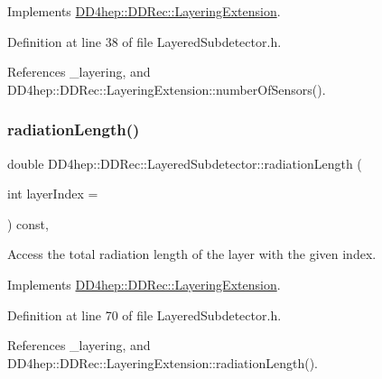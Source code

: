 Implements \hyperlink{class_d_d4hep_1_1_d_d_rec_1_1_layering_extension_a91d00c26112a0456117d1036db335e5d}{D\+D4hep\+::\+D\+D\+Rec\+::\+Layering\+Extension}.



Definition at line 38 of file Layered\+Subdetector.\+h.



References \+\_\+layering, and D\+D4hep\+::\+D\+D\+Rec\+::\+Layering\+Extension\+::number\+Of\+Sensors().

\hypertarget{class_d_d4hep_1_1_d_d_rec_1_1_layered_subdetector_addf81ffffc91b391f0ccd62c37a084a1}{}\label{class_d_d4hep_1_1_d_d_rec_1_1_layered_subdetector_addf81ffffc91b391f0ccd62c37a084a1} 
\subsubsection{\texorpdfstring{radiation\+Length()}{radiationLength()}}
{\footnotesize\ttfamily double D\+D4hep\+::\+D\+D\+Rec\+::\+Layered\+Subdetector\+::radiation\+Length (\begin{DoxyParamCaption}\item[{int}]{layer\+Index = {} }\end{DoxyParamCaption}) const\hspace{0.3cm}{\ttfamily [inline]}, {\ttfamily [virtual]}}



Access the total radiation length of the layer with the given index. 



Implements \hyperlink{class_d_d4hep_1_1_d_d_rec_1_1_layering_extension_adf915de4949eb6f0406045b4b38dd469}{D\+D4hep\+::\+D\+D\+Rec\+::\+Layering\+Extension}.



Definition at line 70 of file Layered\+Subdetector.\+h.



References \+\_\+layering, and D\+D4hep\+::\+D\+D\+Rec\+::\+Layering\+Extension\+::radiation\+Length().

\hypertarget{class_d_d4hep_1_1_d_d_rec_1_1_layered_subdetector_a75e890bc57b982ab0c8b50bf105bd823}{}\label{class_d_d4hep_1_1_d_d_rec_1_1_layered_subdetector_a75e890bc57b982ab0c8b50bf105bd823} 
